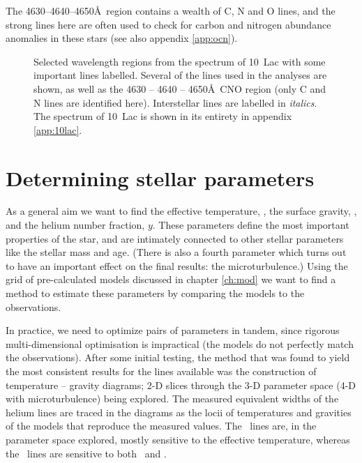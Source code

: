 The 4630--4640--4650\AA\ region contains a wealth of C, N and O lines, and
the strong lines here are often used to check for carbon and nitrogen
abundance anomalies in these stars (see also appendix \ref{app:ocn}).

\begin{figure} %
\epsfxsize=15cm
\setlength{\cen}{(\textwidth / 2) - (\epsfxsize / 2)}
\hspace{\cen}
\caption[Selected wavelength regions from the spectrum of 10~Lac]
{\fcfont Selected wavelength regions from the spectrum of 10~Lac with
some important lines labelled. Several of the lines used in the
analyses are shown, as well as the 4630 -- 4640 -- 4650\AA\ CNO region
(only C and N lines are identified here). Interstellar lines are
labelled in \textit{italics}. The spectrum of 10~Lac is shown in its
entirety in appendix \ref{app:10lac}.}

\label{fig:10Lac:spec}
\end{figure}   %

\section{Determining stellar parameters}

As a general aim we want to find the effective temperature, \teff, the
surface gravity, \logg, and the helium number fraction, $y$. These
parameters define the most important properties of the star, and are
intimately connected to other stellar parameters like the stellar mass
and age. (There is also a fourth parameter which turns out to have an
important effect on the final results: the microturbulence.) Using the
grid of pre-calculated models discussed in chapter
\ref{ch:mod} we want to find a method to estimate these parameters by
comparing the models to the observations.

In practice, we need to optimize pairs of parameters in tandem, since
rigorous multi-dimensional optimisation is impractical (the models do
not perfectly match the observations). After some initial testing, the
method that was found to yield the most consistent results for the
lines available was the construction of temperature -- gravity
diagrams; 2-D slices through the 3-D parameter space (4-D with
microturbulence) being explored. The measured equivalent widths of the
helium lines are traced in the diagrams as the locii of temperatures
and gravities of the models that reproduce the measured values. The
\heii\ lines are, in the parameter space explored, mostly sensitive to
the effective temperature, whereas the \hei\ lines are sensitive to
both \teff\ and \logg.

